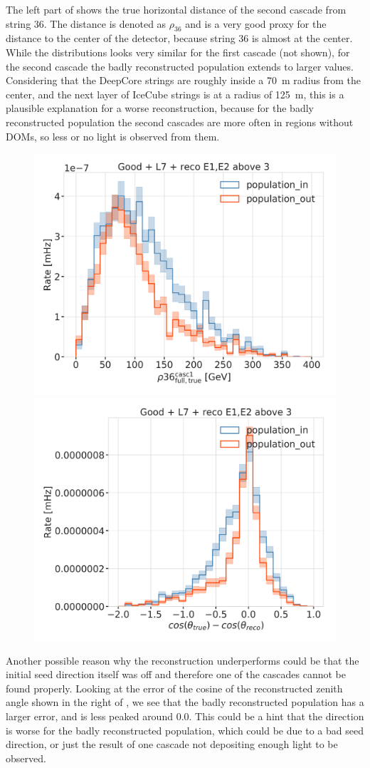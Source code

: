 The left part of  shows the true horizontal distance of the second cascade from string 36. The distance is denoted as $\rho_{36}$ and is a very good proxy for the distance to the center of the detector, because string 36 is almost at the center. While the distributions looks very similar for the first cascade (not shown), for the second cascade the badly reconstructed population extends to larger values. Considering that the DeepCore strings are roughly inside a \SI{70}{\meter} radius from the center, and the next layer of IceCube strings is at a radius of \SI{125}{\meter}, this is a plausible explanation for a worse reconstruction, because for the badly reconstructed population the second cascades are more often in regions without DOMs, so less or no light is observed from them.

\begin{figure}[h]
    \centering
    \includegraphics[width=0.49\linewidth]{figures/results/190607/second_population/casc1_rho36.png}
    \includegraphics[width=0.49\linewidth]{figures/results/190607/second_population/reco_true_cos_zenith_error_populations.png}
    \caption[]{}
\end{figure}

Another possible reason why the reconstruction underperforms could be that the initial seed direction itself was off and therefore one of the cascades cannot be found properly. Looking at the error of the cosine of the reconstructed zenith angle shown in the right of , we see that the badly reconstructed population has a larger error, and is less peaked around 0.0. This could be a hint that the direction is worse for the badly reconstructed population, which could be due to a bad seed direction, or just the result of one cascade not depositing enough light to be observed.

